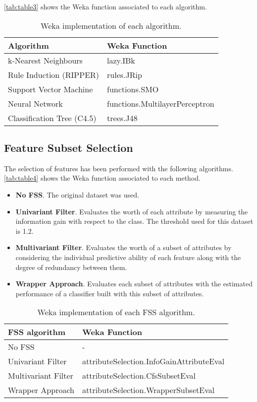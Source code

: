 \documentclass[a4paper,11pt]{article}
\begin{document}
\autoref{tab:table3} shows the Weka function associated to each algorithm.

\begin{table}[h]
\centering
\begin{tabular}{||l|l||}
	\hline
	Algorithm & Weka Function\\
	\hline
	k-Nearest Neighbours & lazy.IBk\\
	Rule Induction (RIPPER) & rules.JRip\\
	Support Vector Machine & functions.SMO\\
	Neural Network & functions.MultilayerPerceptron\\
	Classification Tree (C4.5) & trees.J48\\
	\hline
\end{tabular}
\caption{Weka implementation of each algorithm.}
\label{tab:table3}
\end{table}

\subsection{Feature Subset Selection}
\label{subsec:fss}

The selection of features has been performed with the following algorithms. \autoref{tab:table4} shows the Weka function associated to each method.

\begin{itemize}
\setlength\itemsep{-1ex}
\item \textbf{No FSS}. The original dataset was used.
\item \textbf{Univariant Filter}. Evaluates the worth of each attribute by measuring the information gain with respect to the class. The threshold used for this dataset is 1.2.
\item \textbf{Multivariant Filter}. Evaluates the worth of a subset of attributes by considering the individual predictive ability of each feature along with the degree of redundancy between them.
\item \textbf{Wrapper Approach}. Evaluates each subset of attributes with the estimated performance of a classifier built with this subset of attributes.
\end{itemize}

\begin{table}[h]
\centering
\begin{tabular}{||l|l||}
	\hline
	FSS algorithm & Weka Function\\
	\hline
	No FSS & -\\
	Univariant Filter & attributeSelection.InfoGainAttributeEval\\
	Multivariant Filter & attributeSelection.CfsSubsetEval\\
	Wrapper Approach & attributeSelection.WrapperSubsetEval\\
	\hline
\end{tabular}
\caption{Weka implementation of each FSS algorithm.}
\label{tab:table4}
\end{table}
\end{document}
